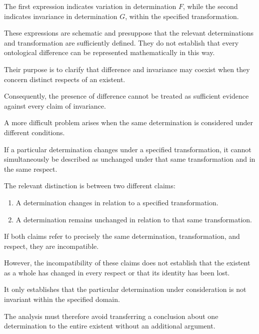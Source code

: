 The first expression indicates variation in
determination \(F\), while the second indicates
invariance in determination \(G\), within the
specified transformation.

These expressions are schematic and presuppose
that the relevant determinations and transformation
are sufficiently defined. They do not establish
that every ontological difference can be represented
mathematically in this way.

Their purpose is to clarify that difference and
invariance may coexist when they concern distinct
respects of an existent.

Consequently, the presence of difference cannot
be treated as sufficient evidence against every
claim of invariance.


A more difficult problem arises when the same
determination is considered under different
conditions.

If a particular determination changes under
a specified transformation, it cannot simultaneously
be described as unchanged under that same
transformation and in the same respect.

The relevant distinction is between two different
claims:

\begin{enumerate}
    \item A determination changes in relation
    to a specified transformation.

    \item A determination remains unchanged
    in relation to that same transformation.
\end{enumerate}

If both claims refer to precisely the same
determination, transformation, and respect,
they are incompatible.

However, the incompatibility of these claims
does not establish that the existent as a whole
has changed in every respect or that its identity
has been lost.

It only establishes that the particular
determination under consideration is not
invariant within the specified domain.

The analysis must therefore avoid transferring
a conclusion about one determination to the
entire existent without an additional argument.

